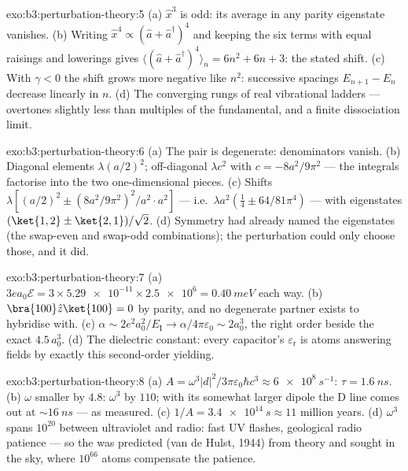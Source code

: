 \begin{solution}{exo:b3:perturbation-theory:5}
(a) $\hat x^3$ is odd: its average in any parity eigenstate
vanishes. (b) Writing $\hat x^4 \propto (\hat a + \hat
a^\dagger)^4$ and keeping the six terms with equal raisings and
lowerings gives $\langle(\hat a + \hat a^\dagger)^4\rangle_n = 6n^2
+ 6n + 3$: the stated shift. (c) With $\gamma < 0$ the shift grows
more negative like $n^2$: successive spacings $E_{n+1} - E_n$
decrease linearly in $n$. (d) The converging rungs of real
vibrational ladders --- overtones slightly less than multiples of
the fundamental, and a finite dissociation limit.
\end{solution}

\begin{solution}{exo:b3:perturbation-theory:6}
(a) The pair is degenerate: denominators vanish. (b) Diagonal
elements $\lambda(a/2)^2$; off-diagonal $\lambda c^2$ with $c =
-8a^2/9\pi^2$ --- the integrals factorise into the two
one-dimensional pieces. (c) Shifts $\lambda[(a/2)^2 \pm
(8a^2/9\pi^2)^2/a^2\cdot a^2]$ --- i.e.\ $\lambda a^2(\tfrac14 \pm
64/81\pi^4)$ --- with eigenstates $(\ket{1,2} \pm \ket{2,1})/
\sqrt2$. (d) Symmetry had already named the eigenstates (the
swap-even and swap-odd combinations); the perturbation could only
choose those, and it did.
\end{solution}

\begin{solution}{exo:b3:perturbation-theory:7}
(a) $3ea_0\mathcal E = 3 \times \num{5.29e-11} \times \num{2.5e6}
= \qty{0.40}{meV}$ each way. (b) $\bra{100}\hat z\ket{100} = 0$ by
parity, and no degenerate partner exists to hybridise with. (c)
$\alpha \sim 2e^2a_0^2/E_{\text{I}} \to \alpha/4\pi\varepsilon_0
\sim 2a_0^3$, the right order beside the exact $4.5\,a_0^3$. (d)
The dielectric constant: every capacitor's $\varepsilon_{\text{r}}$
is atoms answering fields by exactly this second-order yielding.
\end{solution}

\begin{solution}{exo:b3:perturbation-theory:8}
(a) $A = \omega^3|d|^2/3\pi\varepsilon_0\hbar c^3 \approx
\qty{6e8}{s^{-1}}$: $\tau = \qty{1.6}{ns}$. (b) $\omega$ smaller by
$4.8$: $\omega^3$ by $110$; with its somewhat larger dipole the D
line comes out at $\sim\qty{16}{ns}$ --- as measured. (c)
$1/A = \qty{3.4e14}{s} \approx 11$ million years. (d) $\omega^3$
spans $10^{20}$ between ultraviolet and radio: fast UV flashes,
geological radio patience --- so the  was predicted
(van de Hulst, 1944) from theory and sought in the sky, where
$10^{66}$ atoms compensate the patience.
\end{solution}

